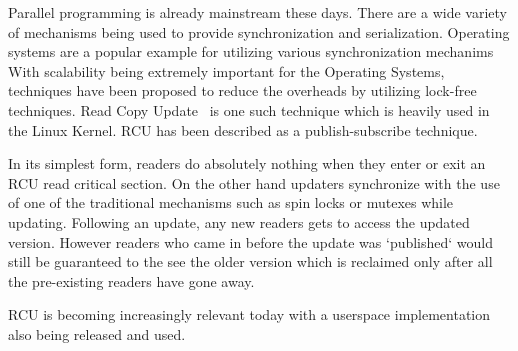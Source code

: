 Parallel programming is already mainstream these days. There are a wide variety
of mechanisms being used to provide synchronization and serialization.
Operating systems are a popular example for utilizing various synchronization
mechanims%
With scalability being extremely important for the Operating Systems,
techniques have been proposed to reduce the overheads by utilizing lock-free
techniques. Read Copy Update~\cite{paulmck:TechReport} is one such technique which is
heavily used in the Linux Kernel. RCU has been described as a publish-subscribe
technique.

In its simplest form, readers do absolutely nothing when they enter or exit an
RCU read critical section. On the other hand updaters synchronize with the use
of one of the traditional mechanisms such as spin locks or mutexes while updating.
Following an update, any new readers gets to access the updated version. However
readers who came in before the update was `published` would still be guaranteed
to the see the older version which is reclaimed only after all the pre-existing
readers have gone away.

RCU is becoming increasingly relevant today with a userspace implementation also
being released and used.%
